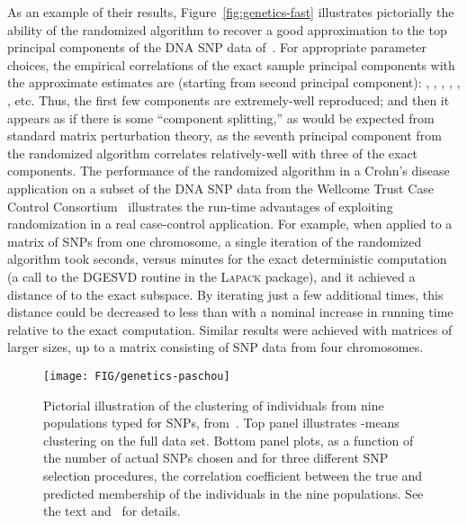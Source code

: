 \documentclass[twoside]{article}
\begin{document}
As an example of their results,
Figure~\ref{fig:genetics-fast} illustrates pictorially the ability of the 
randomized algorithm to recover a good approximation to the top principal 
components of the DNA SNP data of~\cite{Nov08}.
For appropriate parameter choices, the empirical correlations of the exact 
sample principal components with the approximate estimates are (starting 
from second principal component): , , , , 
, , etc.
Thus, the first few components are extremely-well reproduced; and then it 
appears as if there is some ``component splitting,'' as would be expected 
from standard matrix perturbation theory, as the seventh principal component 
from the randomized algorithm correlates relatively-well with three of the 
exact components.
The performance of the randomized algorithm in a Crohn's disease application 
on a subset of the DNA SNP data from the Wellcome Trust Case Control 
Consortium~\cite{WTC07} illustrates the run-time advantages of exploiting 
randomization in a real case-control application.
For example, when applied to a  matrix of SNPs from one 
chromosome, a single iteration of the randomized algorithm took  seconds, 
versus  minutes for the exact deterministic computation (a call to the 
DGESVD routine in the \textsc{Lapack} package), and it achieved a distance 
of  to the exact subspace. 
By iterating just a few additional times, this distance could be decreased 
to less than  with a nominal increase in running time relative to 
the exact computation.
Similar results were achieved with matrices of larger sizes, up to a 
 matrix consisting of SNP data from four chromosomes.

\begin{figure}
   \begin{center}
         \texttt{[image: FIG/genetics-paschou]}
\end{center}
\caption{
Pictorial illustration of the clustering of individuals from nine 
populations typed for  SNPs, from~\cite{Paschou07b}.
Top panel illustrates -means clustering on the full data set.
Bottom panel plots, as a function of the number of actual SNPs chosen and 
for  three different SNP selection procedures, the correlation coefficient 
between the true and predicted membership of the individuals in the nine 
populations.  See the text and~\cite{Paschou07b} for details.
}
\label{fig:genetics-interp}
\end{figure}
\end{document}
